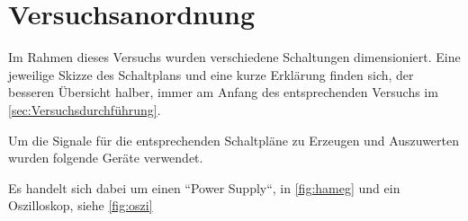 \documentclass[11pt,ngerman]{scrartcl}
\begin{document}
\section{Versuchsanordnung}\label{sec:Versuchsanordnung}

Im Rahmen dieses Versuchs wurden verschiedene Schaltungen dimensioniert. Eine jeweilige Skizze des Schaltplans und eine kurze Erklärung finden sich, der besseren Übersicht halber, immer am Anfang des entsprechenden Versuchs im \autoref{sec:Versuchsdurchführung}.

\vspace{2mm}

Um die Signale für die entsprechenden Schaltpläne zu Erzeugen und Auszuwerten wurden folgende Geräte verwendet.

\vspace{2mm}

Es handelt sich dabei um einen ``Power Supply``, in \autoref{fig:hameg} und ein Oszilloskop, siehe \autoref{fig:oszi}

\vspace{2mm}
\end{document}
